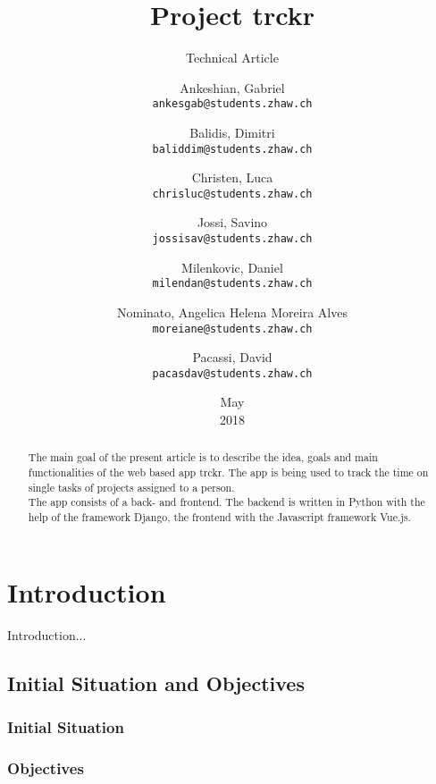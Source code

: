 \documentclass[a4paper, 12pt, headsepline]{scrartcl}
\title{Project trckr}
\subtitle{Technical Article}
\date{May \\ 2018}
\author{
Ankeshian, Gabriel\\
\texttt{ankesgab@students.zhaw.ch}
\and
Balidis, Dimitri\\
\texttt{baliddim@students.zhaw.ch}
\and
Christen, Luca\\
\texttt{chrisluc@students.zhaw.ch}
\and
Jossi, Savino\\
\texttt{jossisav@students.zhaw.ch}
\and
Milenkovic, Daniel\\
\texttt{milendan@students.zhaw.ch}
\and
Nominato, Angelica Helena Moreira Alves\\
\texttt{moreiane@students.zhaw.ch}
\and
Pacassi, David\\
\texttt{pacasdav@students.zhaw.ch}}
\begin{document}
\maketitle
\pagebreak

\begin{abstract}
The main goal of the present article is to describe the idea, goals and main functionalities of the web based app trckr. The app is being used
to track the time on single tasks of projects assigned to a person.\\
The app consists of a back- and frontend. The backend is written in Python with the help of the framework Django, the frontend with the Javascript
framework Vue.js.

\end{abstract}

\pagebreak


\tableofcontents

\pagebreak

\section{Introduction}
Introduction...

\subsection{Initial Situation and Objectives}

\subsubsection{Initial Situation}

\subsubsection{Objectives}
\end{document}
